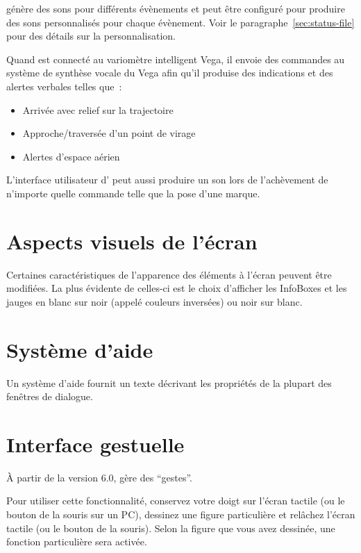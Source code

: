 \xc{} génère des sons pour différents évènements et peut être configuré pour
produire des sons personnalisés pour chaque évènement. Voir le paragraphe~\ref{sec:status-file} pour
des détails sur la personnalisation.

Quand \xc{} est connecté au variomètre intelligent Vega, il envoie
des commandes au système de synthèse vocale du Vega afin qu'il produise des indications et des alertes verbales telles que~:
\begin{itemize}
\item Arrivée avec relief sur la trajectoire
\item Approche/traversée d'un point de virage
\item Alertes d'espace aérien
\end{itemize}

L'interface utilisateur d'\xc{} peut aussi produire un son lors de l'achèvement
de n'importe quelle commande telle que la pose d'une marque.


\section{Aspects visuels de l'écran}

Certaines caractéristiques de l'apparence des éléments à l'écran peuvent être modifiées.
La plus évidente de celles-ci est le choix d'afficher les InfoBoxes et
les jauges en blanc sur noir (appelé couleurs inversées) ou noir sur blanc.

\section{Système d'aide}

Un système d'aide fournit un texte décrivant les propriétés de la plupart
des fenêtres de dialogue.

\section{Interface gestuelle}\label{sec:gestures}
À partir de la version 6.0, \xc{} gère des ``gestes''. %

Pour utiliser cette fonctionnalité, conservez votre doigt sur
l'écran tactile (ou le bouton de la souris sur un PC), dessinez une figure particulière et relâchez
l'écran tactile (ou le bouton de la souris). Selon la figure que vous avez dessinée,
une fonction particulière sera activée. 

